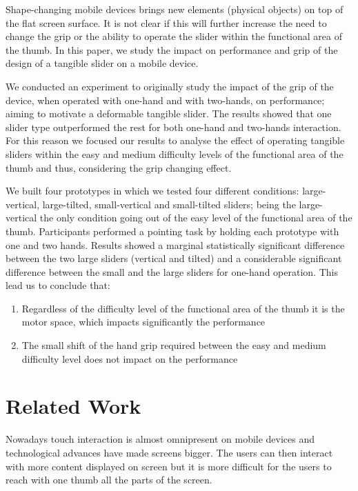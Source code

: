 \documentclass{sigchi}
\begin{document}
Shape-changing mobile devices brings new elements (physical objects) on top of the flat screen surface. It is not clear if this will further increase the need to change the grip or the ability to operate the slider within the functional area of the thumb. In this paper, we study the impact on performance and grip of the design of a tangible slider on a mobile device.

We conducted an experiment to originally study the impact of the grip of the device, when operated with one-hand and with two-hands, on performance; aiming to motivate a deformable tangible slider. The results showed that one slider type outperformed the rest for both one-hand and two-hands interaction. For this reason we focused our results to analyse the effect of operating tangible sliders within the easy and medium difficulty levels of the functional area of the thumb and thus, considering the grip changing effect.

We built four prototypes in which we tested four different conditions: large-vertical, large-tilted, small-vertical and small-tilted sliders; being the large-vertical the only condition going out of the easy level of the functional area of the thumb. Participants performed a pointing task by holding each prototype with one and two hands. Results showed a marginal statistically significant difference between the two large sliders (vertical and tilted) and a considerable significant difference between the small and the large sliders for one-hand operation. This lead us to conclude that:

\begin{enumerate}
\item Regardless of the difficulty level of the functional area of the thumb it is the motor space, which impacts significantly the performance
\item The small shift of the hand grip required between the easy and medium difficulty level does not impact on the performance
\end{enumerate}

\section{Related Work}
Nowadays touch interaction is almost omnipresent on mobile devices and technological advances have made screens bigger. The users can then interact with more content displayed on screen but it is more difficult for the users to reach with one thumb all the parts of the screen.
\end{document}
